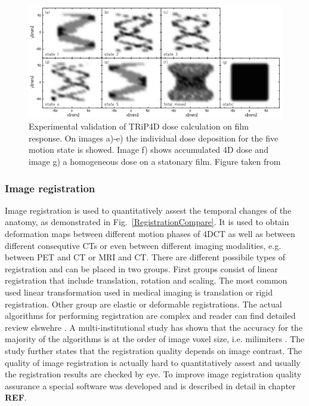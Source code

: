 \documentclass[type=dr, dr=rernat, accentcolor=tud7b,colorbacktitle, bigchapter, openright, twoside, 12pt ]{tudthesis}
\begin{document}
\begin{figure}[H]
\begin{center}
\includegraphics[scale=0.35]{./Images/4DtreatmentPlanning.png}
\caption{Experimental validation of TRiP4D dose calculation on film response. On images a)-e) the individual dose deposition for the five motion state is showed.
Image f) shows accumulated 4D dose and image g) a homogeneous dose on a statonary film. Figure taken from \cite{Richter2012}}
\label{TRiP4Ddose}
\end{center}
\end{figure}

\subsubsection{Image registration}
\label{sec:registration}

Image registration is used to quantitatively assest the temporal changes of the anatomy, as demonstrated in Fig.~\ref{RegistrationCompare}. It is used to obtain deformation maps between different motion phases of 4DCT
as well as between different consequtive CTs or even between different imaging modalities, e.g. between PET and CT or MRI and CT. There are different possibile types of
registration and can be placed in two groups. First groups consist of linear registration that include translation, rotation and scaling. The most common used linear transformation used
in medical imaging is translation or rigid registration. Other group are elastic or deformable registrations. The actual algorithms for performing registration are complex and reader can
find detailed review elswehre \cite{Hill2001,Brock2006,Rietzel2006a}. A multi-institutional study has shown that the accuracy for the majority of the algorithms is at the order of image voxel
size, i.e. milimiters \cite{Brock2010}. The study further states that the registration quality depends on image contrast. The quality of image registration is actually hard to quantitatively
assest and usually the registration results are checked by eye. To improve image registration quality assurance a special software was developed and is described in detail in chapter \textbf{REF}.
\end{document}

